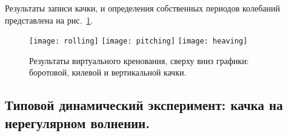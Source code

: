 Результаты записи качки, и определения собственных периодов колебаний представлена на рис.~\ref{virtual_rolling}.

\begin{figure}[ht]
\begin{center}
\texttt{[image: rolling]}
\texttt{[image: pitching]}
\texttt{[image: heaving]}
\end{center}
\caption{Результаты виртуального кренования, сверху вниз графики: боротовой, килевой и вертикальной качки.}
\label{virtual_rolling}
\end{figure}



\subsection{Типовой динамический эксперимент: качка на нерегулярном волнении.}

